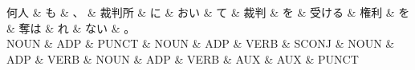 \documentclass[tikz,border=5pt]{standalone}
\begin{document}
\normalsize
\begin{dependency}[edge unit distance=12.0pt]
    \begin{deptext}[column sep=1em]
        何人 \& も \& 、 \& 裁判所 \& に \& おい \& て \& 裁判 \& を \& 受ける \& 権利 \& を \& 奪は \& れ \& ない \& 。\\
        NOUN \& ADP \& PUNCT \& NOUN \& ADP \& VERB \& SCONJ \& NOUN \& ADP \& VERB \& NOUN \& ADP \& VERB \& AUX \& AUX \& PUNCT\\
    \end{deptext}
\end{dependency}
\end{document}
